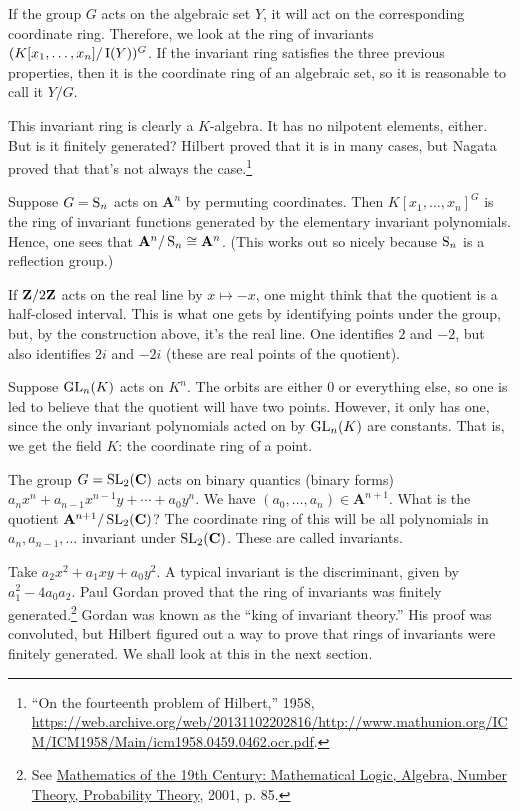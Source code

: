 \documentclass [11 pt, oneside, margin = 1 in] {article}
\begin{document}
If the group $G$ acts on the algebraic set $Y$, it will act on the corresponding coordinate ring. Therefore, we look at the ring of invariants $(K[x_1,\hdots,x_n]/\operatorname{I}(Y))^G$. If the invariant ring satisfies the three previous properties, then it is the coordinate ring of an algebraic set, so it is reasonable to call it $Y/G$.

This invariant ring is clearly a $K$-algebra. It has no nilpotent elements, either. But is it finitely generated? Hilbert proved that it is in many cases, but Nagata proved that that's not always the case.\footnote{``On the fourteenth problem of Hilbert,'' 1958, \url{https://web.archive.org/web/20131102202816/http://www.mathunion.org/ICM/ICM1958/Main/icm1958.0459.0462.ocr.pdf}.}

\begin{example}[ ]\label{}\text{}
Suppose $G=\operatorname{S}_n$ acts on $\mathbf{A}^n$ by permuting coordinates. Then $K[x_1,\hdots, x_n]^G$ is the ring of invariant functions generated by the elementary invariant polynomials. Hence, one sees that $\mathbf{A}^n/\operatorname{S}_n\cong \mathbf{A}^n$. (This works out so nicely because $\operatorname{S}_n$ is a reflection group.)
\end{example}


If $\mathbf Z / 2\mathbf Z$ acts on the real line by $x\longmapsto -x$, one might think that the quotient is a half-closed interval. This is what one gets by identifying points under the group, but, by the construction above, it's the real line. One identifies $2$ and $-2$, but also identifies $2i$ and $-2i$ (these are real points of the quotient).


 \begin{example}[ ]\label{}\text{}
Suppose $\operatorname{GL}_{n}(K)$ acts on $K^n$. The orbits are either $0$ or everything else, so one is led to believe that the quotient will have two points. However, it only has one, since the only invariant polynomials acted on by $\operatorname{GL}_{n}(K)$ are constants. That is, we get the field $K$: the coordinate ring of a point.
\end{example}

\begin{example}\label{}\text{}
The group $G=\operatorname{SL}_{2}(\mathbf{C})$ acts on binary quantics (binary forms) $a_nx^n + a_{n-1}x^{n-1}y + \cdots +a_0y^n$. We have $(a_0,\hdots, a_n)\in \mathbf{A}^{n+1}$. What is the quotient $\mathbf{A}^{n+1}/\operatorname{SL}_{2}(\mathbf{C})$? The coordinate ring of this will be all polynomials in $a_n,a_{n-1},\hdots$ invariant under $\operatorname{SL}_{2}(\mathbf{C})$. These are called invariants. 

Take $a_2x^2 + a_1xy + a_0y^2$. A typical invariant is the discriminant, given by $a_1^2 - 4a_0a_2$. Paul Gordan proved that the ring of invariants was finitely generated.\footnote{See \underline{Mathematics of the 19th Century: Mathematical Logic, Algebra, Number Theory, Probability Theory}, 2001, p. 85.} Gordan was known as the ``king of invariant theory.'' His proof was convoluted, but Hilbert figured out a way to prove that rings of invariants were finitely generated. We shall look at this in the next section.
\end{example}
\end{document}
